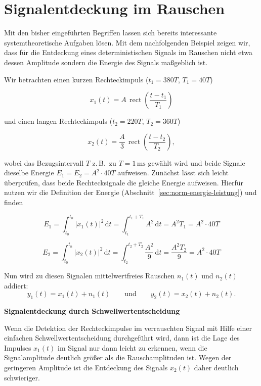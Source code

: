 \section{Signalentdeckung im Rauschen}
\label{sec:signalentdeckung-rauschen}

\begin{beispiel}
Mit den bisher eingeführten Begriffen lassen sich bereits interessante systemtheoretische Aufgaben lösen. Mit dem nachfolgenden Beispiel zeigen wir, dass für die Entdeckung eines deterministischen Signals im Rauschen nicht etwa dessen Amplitude sondern die Energie des Signals maßgeblich ist.

Wir betrachten einen kurzen Rechteckimpuls ($t_1 = 380T$, $T_1 = 40T$)

$$
x_1(t) = A\,\operatorname{rect}\!\left(\frac{t - t_1}{T_1}\right)
$$

und einen langen Rechteckimpuls ($t_2 = 220T$, $T_2 = 360T$)

$$
x_2(t) = \frac{A}{3}\,\operatorname{rect}\!\left(\frac{t - t_2}{T_2}\right),
$$

wobei das Bezugsintervall $T$ z.\,B.\ zu $T = 1\,\text{ms}$ gewählt wird und beide Signale dieselbe Energie $E_1 = E_2 = A^2 \cdot 40T$ aufweisen. Zunächst lässt sich leicht überprüfen, dass beide Rechtecksignale die gleiche Energie aufweisen. Hierfür nutzen wir die Definition der Energie (Abschnitt~\ref{sec:norm-energie-leistung}) und finden

$$
E_1 = \int_{t_0}^{t_n} |x_1(t)|^2\,\mathrm{d}t = \int_{t_1}^{t_1+T_1} A^2\,\mathrm{d}t = A^2 T_1 = A^2 \cdot 40T
$$

$$
E_2 = \int_{t_0}^{t_n} |x_2(t)|^2\,\mathrm{d}t = \int_{t_2}^{t_2+T_2} \frac{A^2}{9}\,\mathrm{d}t = \frac{A^2 T_2}{9} = A^2 \cdot 40T
$$

Nun wird zu diesen Signalen mittelwertfreies Rauschen $n_1(t)$ und $n_2(t)$ addiert:
$$
y_1(t) = x_1(t) + n_1(t) \qquad \text{und} \qquad y_2(t) = x_2(t) + n_2(t).
$$


\textbf{Signalentdeckung durch Schwellwertentscheidung}

Wenn die Detektion der Rechteckimpulse im verrauschten Signal mit Hilfe einer einfachen Schwellwertentscheidung durchgeführt wird, dann ist die Lage des Impulses $x_1(t)$ im Signal nur dann leicht zu erkennen, wenn die Signalamplitude deutlich größer als die Rausch\-amplituden ist. Wegen der geringeren Amplitude ist die Entdeckung des Signals $x_2(t)$ daher deutlich schwieriger.


\end{beispiel}
